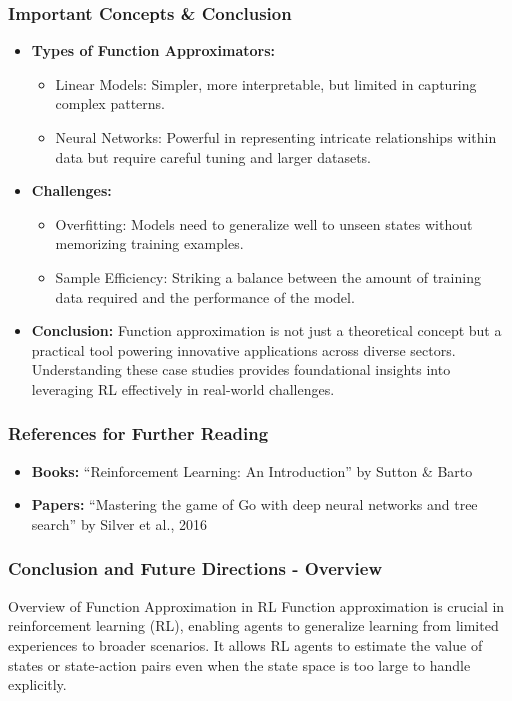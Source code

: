 \documentclass[aspectratio=169]{beamer}
\begin{document}
\begin{frame}[fragile]
    \frametitle{Important Concepts \& Conclusion}
    \begin{itemize}
        \item \textbf{Types of Function Approximators:}
        \begin{itemize}
            \item Linear Models: Simpler, more interpretable, but limited in capturing complex patterns.
            \item Neural Networks: Powerful in representing intricate relationships within data but require careful tuning and larger datasets.
        \end{itemize}

        \item \textbf{Challenges:}
        \begin{itemize}
            \item Overfitting: Models need to generalize well to unseen states without memorizing training examples.
            \item Sample Efficiency: Striking a balance between the amount of training data required and the performance of the model.
        \end{itemize}

        \item \textbf{Conclusion:} Function approximation is not just a theoretical concept but a practical tool powering innovative applications across diverse sectors. Understanding these case studies provides foundational insights into leveraging RL effectively in real-world challenges.
    \end{itemize}
\end{frame}

\begin{frame}[fragile]
    \frametitle{References for Further Reading}
    \begin{itemize}
        \item \textbf{Books:} ``Reinforcement Learning: An Introduction'' by Sutton \& Barto
        \item \textbf{Papers:} ``Mastering the game of Go with deep neural networks and tree search'' by Silver et al., 2016
    \end{itemize}
\end{frame}

\begin{frame}[fragile]
    \frametitle{Conclusion and Future Directions - Overview}
    \begin{block}{Overview of Function Approximation in RL}
        Function approximation is crucial in reinforcement learning (RL), enabling agents to generalize learning from limited experiences to broader scenarios. It allows RL agents to estimate the value of states or state-action pairs even when the state space is too large to handle explicitly.
    \end{block}
\end{frame}
\end{document}

